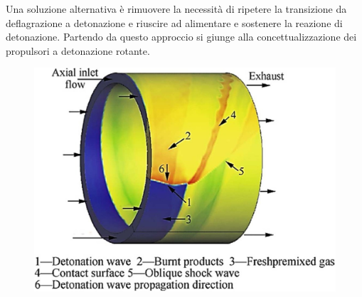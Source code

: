 \begin{frame}
  Una soluzione alternativa è rimuovere la necessità di ripetere la transizione da deflagrazione a detonazione e riuscire ad alimentare e sostenere la reazione di detonazione. Partendo da questo approccio si giunge alla concettualizzazione dei propulsori a detonazione rotante.
\begin{figure}[H]
\centering
\includegraphics[scale=.6]{rde_intro.png} %
\end{figure}
\end{frame}
\begin{frame}
\end{frame}

